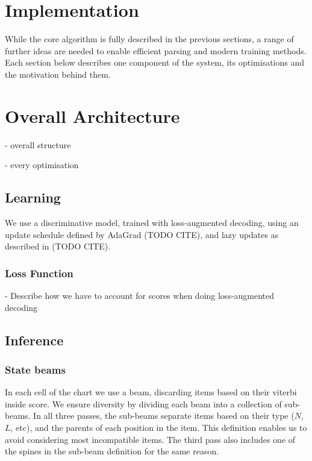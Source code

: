 \section{Implementation}

While the core algorithm is fully described in the previous sections, a range of further ideas are needed to enable efficient parsing and modern training methods.
Each section below describes one component of the system, its optimisations and the motivation behind them.

\section{Overall Architecture}

- overall structure

- every optimisation

\subsection{Learning}

We use a discriminative model, trained with loss-augmented decoding, using an update schedule defined by AdaGrad (TODO CITE), and lazy updates as described in (TODO CITE).


\subsubsection{Loss Function}

- Describe how we have to account for scores when doing loss-augmented decoding

\subsection{Inference}

\subsubsection{State beams}

In each cell of the chart we use a beam, discarding items based on their viterbi inside score.
We ensure diversity by dividing each beam into a collection of sub-beams.
In all three passes, the sub-beams separate items based on their type ($N$, $L$, etc), and the parents of each position in the item.
This definition enables us to avoid considering most incompatible items.
The third pass also includes one of the spines in the sub-beam definition for the same reason.

